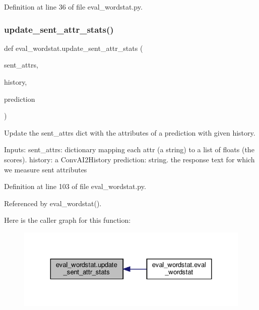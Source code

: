 Definition at line 36 of file eval\+\_\+wordstat.\+py.

\mbox{\label{namespaceeval__wordstat_a27c623656f9e3e3f0b0bb6ef04781d9c}} 
\subsubsection{\texorpdfstring{update\+\_\+sent\+\_\+attr\+\_\+stats()}{update\_sent\_attr\_stats()}}
{\footnotesize\ttfamily def eval\+\_\+wordstat.\+update\+\_\+sent\+\_\+attr\+\_\+stats (\begin{DoxyParamCaption}\item[{}]{sent\+\_\+attrs,  }\item[{}]{history,  }\item[{}]{prediction }\end{DoxyParamCaption})}

\begin{DoxyVerb}Update the sent_attrs dict with the attributes of a prediction with given history.

Inputs:
  sent_attrs: dictionary mapping each attr (a string) to a list of floats
    (the scores).
  history: a ConvAI2History
  prediction: string. the response text for which we measure sent attributes
\end{DoxyVerb}
 

Definition at line 103 of file eval\+\_\+wordstat.\+py.



Referenced by eval\+\_\+wordstat().

Here is the caller graph for this function\+:
\nopagebreak
\begin{figure}[H]
\begin{center}
\leavevmode
\includegraphics[width=324pt]{namespaceeval__wordstat_a27c623656f9e3e3f0b0bb6ef04781d9c_icgraph}
\end{center}
\end{figure}



